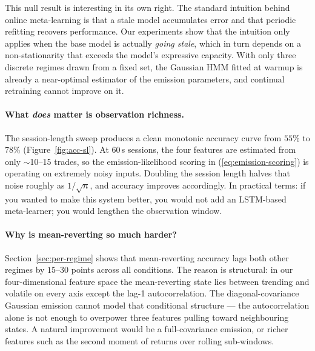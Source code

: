 \documentclass[11pt,a4paper]{article}
\begin{document}
This null result is interesting in its own right. The standard intuition
behind online meta-learning is that a stale model accumulates error and that
periodic refitting recovers performance. Our experiments show that the
intuition only applies when the base model is actually \emph{going stale},
which in turn depends on a non-stationarity that exceeds the model's
expressive capacity. With only three discrete regimes drawn from a fixed
set, the Gaussian HMM fitted at warmup is already a near-optimal estimator
of the emission parameters, and continual retraining cannot improve on it.

\paragraph{What \emph{does} matter is observation richness.}
The session-length sweep produces a clean monotonic accuracy curve from
$55\%$ to $78\%$ (Figure~\ref{fig:acc-sl}). At 60\,s sessions, the four
features are estimated from only $\sim$10--15 trades, so the
emission-likelihood scoring in (\ref{eq:emission-scoring}) is operating on
extremely noisy inputs. Doubling the session length halves that noise
roughly as $1/\sqrt{n}$, and accuracy improves accordingly. In practical
terms: if you wanted to make this system better, you would not add an
LSTM-based meta-learner; you would lengthen the observation window.

\paragraph{Why is mean-reverting so much harder?}
Section~\ref{sec:per-regime} shows that mean-reverting accuracy lags both
other regimes by $15$--$30$ points across all conditions. The reason is
structural: in our four-dimensional feature space the mean-reverting state
lies between trending and volatile on every axis except the lag-1
autocorrelation. The diagonal-covariance Gaussian emission cannot model
that conditional structure --- the autocorrelation alone is not enough to
overpower three features pulling toward neighbouring states. A natural
improvement would be a full-covariance emission, or richer features such as
the second moment of returns over rolling sub-windows.
\end{document}
